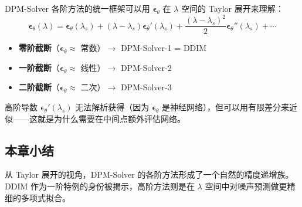 DPM-Solver 各阶方法的统一框架可以用 $\boldsymbol{\epsilon}_\theta$ 在 $\lambda$ 空间的 Taylor 展开来理解：
$$\boldsymbol{\epsilon}_\theta(\lambda) = \boldsymbol{\epsilon}_\theta(\lambda_s) + (\lambda - \lambda_s) \boldsymbol{\epsilon}_\theta'(\lambda_s) + \frac{(\lambda - \lambda_s)^2}{2} \boldsymbol{\epsilon}_\theta''(\lambda_s) + \cdots$$

\begin{itemize}
    \item \textbf{零阶截断}（$\boldsymbol{\epsilon}_\theta \approx$ 常数）$\to$ DPM-Solver-1 = DDIM
    \item \textbf{一阶截断}（$\boldsymbol{\epsilon}_\theta \approx$ 线性）$\to$ DPM-Solver-2
    \item \textbf{二阶截断}（$\boldsymbol{\epsilon}_\theta \approx$ 二次）$\to$ DPM-Solver-3
\end{itemize}

高阶导数 $\boldsymbol{\epsilon}_\theta'(\lambda_s)$ 无法解析获得（因为 $\boldsymbol{\epsilon}_\theta$ 是神经网络），但可以用有限差分来近似——这就是为什么需要在中间点额外评估网络。

\subsection{本章小结}

从 Taylor 展开的视角，DPM-Solver 的各阶方法形成了一个自然的精度递增族。DDIM 作为一阶特例的身份被揭示，高阶方法则是在 $\lambda$ 空间中对噪声预测做更精细的多项式拟合。


